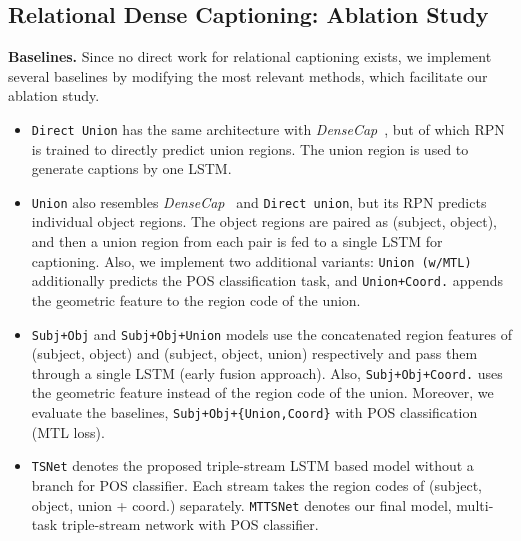 \documentclass[10pt,twocolumn,letterpaper]{article}
\begin{document}
\subsection{Relational Dense Captioning: Ablation Study}
\label{sec:exp_relation}


\noindent\textbf{Baselines.} Since no direct work for relational captioning exists, we implement several baselines by modifying the most relevant methods, which facilitate our ablation study.

{\setdefaultleftmargin{0mm}{}{}{}{}{}
\begin{itemize}
\item \texttt{Direct Union} has the same architecture with \emph{DenseCap}~\cite{johnson2016densecap}, but of which RPN is trained to directly predict union regions.
The union region is used to generate captions by one LSTM.\vspace{0mm}

\item \texttt{Union} also resembles \emph{DenseCap}~\cite{johnson2016densecap} and \texttt{Direct union}, but its RPN predicts individual object regions. 
The object regions are paired as (subject, object), and then a union region from each pair is fed to a single LSTM for captioning.
Also, we implement two additional variants: \texttt{Union (w/MTL)} additionally predicts the POS classification task, and 
\texttt{Union+Coord.} appends the geometric feature to the region code of the union.\vspace{0mm}

\item \texttt{Subj+Obj} and \texttt{Subj+Obj+Union} models use the concatenated region features of (subject, object) and (subject, object, union) respectively and pass them through a single LSTM (early fusion approach).
Also, \texttt{Subj+Obj+Coord.} uses the geometric feature instead of the region code of the union.
Moreover, we {evaluate the baselines}, \texttt{Subj+Obj+\{Union,Coord\}} with POS classification (MTL loss).
\vspace{0mm}

\item \texttt{TSNet} denotes the proposed triple-stream LSTM based model without a branch for POS classifier.
Each stream takes the region codes of (subject, object, union + coord.) separately. 
\texttt{MTTSNet} denotes our final model, multi-task triple-stream network with POS classifier.

\end{itemize}
}
\end{document}
